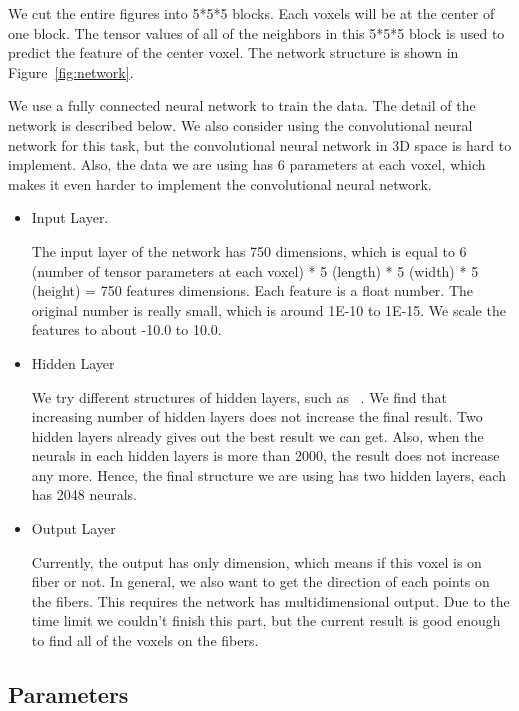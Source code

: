 \documentclass[10pt,twocolumn,letterpaper]{article}
\begin{document}
	We cut the entire figures into 5*5*5 blocks. Each voxels will be at the center of one block. The tensor values of all of the neighbors in this 5*5*5 block is used to predict the feature of the center voxel. The network structure is shown in Figure~\ref{fig:network}.
	
	We use a fully connected neural network to train the data. The detail of the network is described below. We also consider using the convolutional neural network for this task, but the convolutional neural network in 3D space is hard to implement. Also, the data we are using has 6 parameters at each voxel, which makes it even harder to implement the convolutional neural network.
	
	\begin{itemize}
		\item Input Layer. 
		
		The input layer of the network has 750 dimensions, which is equal to 6 (number of tensor parameters at each voxel) * 5 (length) * 5 (width) * 5 (height) = 750 features dimensions. Each feature is a float number. The original number is really small, which is around 1E-10 to 1E-15. We scale the features to about -10.0 to 10.0.
		
		\item Hidden Layer
		
		We try different structures of hidden layers, such as ~\cite{deepbig}. We find that increasing number of hidden layers does not increase the final result. Two hidden layers already gives out the best result we can get. Also, when the neurals in each hidden layers is more than 2000, the result does not increase any more. Hence, the final structure we are using has two hidden layers, each has 2048 neurals.
		
		\item Output Layer
		
		Currently, the output has only dimension, which means if this voxel is on fiber or not. In general, we also want to get the direction of each points on the fibers. This requires the network has multidimensional output. Due to the time limit we couldn't finish this part, but the current result is good enough to find all of the voxels on the fibers.
		
	\end{itemize}
	
	
	
	\subsection{Parameters}
	
\end{document}
